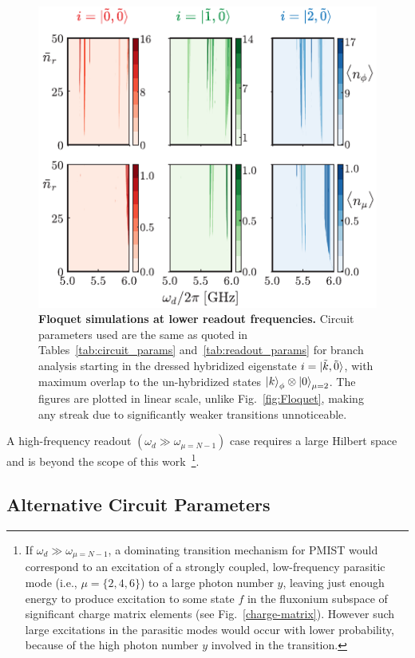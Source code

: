 \documentclass[%
reprint,
superscriptaddress,
 amsmath,amssymb,
 aps,
 prx,
longbibliography,
floatfix,
]{revtex4-2}
\begin{document}
\begin{figure}[t]
    \centering
    \includegraphics[width=\linewidth]{Figures/Floquet_low.pdf}
    \caption{{\bf Floquet simulations at lower readout frequencies.} Circuit parameters used are the same as quoted in Tables~\ref{tab:circuit_params} and~\ref{tab:readout_params} for branch analysis starting in the dressed hybridized eigenstate $i=\ket{\tilde{k},\tilde{0}}$, with maximum overlap to the un-hybridized states $\ket{k}_\phi\otimes\ket{0}_{\mu=2}$. The figures are plotted in linear scale, unlike Fig.~\ref{fig:Floquet}, making any streak due to significantly weaker transitions unnoticeable.}
    \label{fig:Flo_low}
\end{figure}

A high-frequency readout $(\omega_d\gg \omega_{\mu=N-1})$ case requires a large Hilbert space and is beyond the scope of this work~\footnote{If  $\omega_d\gg \omega_{\mu=N-1}$, a dominating transition mechanism for PMIST would correspond to an excitation of a strongly coupled, low-frequency parasitic mode (i.e., $\mu=\{2,4,6\}$) to a large photon number $y$, leaving just enough energy to produce excitation to some state $f$ in the fluxonium subspace of significant charge matrix elements (see Fig.~\ref{charge-matrix}). However such large excitations in the parasitic modes would occur with lower probability, because of the high photon number $y$ involved in the transition.}. 


\subsection{Alternative Circuit Parameters}\label{Will_circuit}
\end{document}
